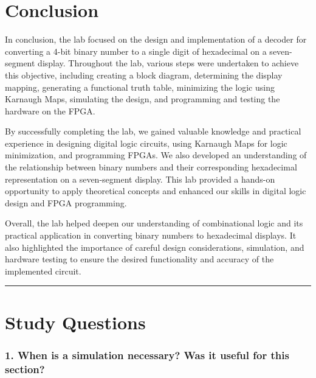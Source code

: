 \documentclass{article}
\begin{document}
\section*{\textcolor{mycolor}{Conclusion}}
In conclusion, the lab focused on the design and implementation of a decoder for converting a 4-bit binary number to a single digit of hexadecimal on a seven-segment display. Throughout the lab, various steps were undertaken to achieve this objective, including creating a block diagram, determining the display mapping, generating a functional truth table, minimizing the logic using Karnaugh Maps, simulating the design, and programming and testing the hardware on the FPGA.

By successfully completing the lab, we gained valuable knowledge and practical experience in designing digital logic circuits, using Karnaugh Maps for logic minimization, and programming FPGAs. We also developed an understanding of the relationship between binary numbers and their corresponding hexadecimal representation on a seven-segment display. This lab provided a hands-on opportunity to apply theoretical concepts and enhanced our skills in digital logic design and FPGA programming.

Overall, the lab helped deepen our understanding of combinational logic and its practical application in converting binary numbers to hexadecimal displays. It also highlighted the importance of careful design considerations, simulation, and hardware testing to ensure the desired functionality and accuracy of the implemented circuit.
\vspace{5mm}
\hrule

\section*{\textcolor{mycolor}{Study Questions}}
\subsubsection*{\textcolor{mycolor}{1. When is a simulation necessary? Was it useful for this section?}}
\end{document}

